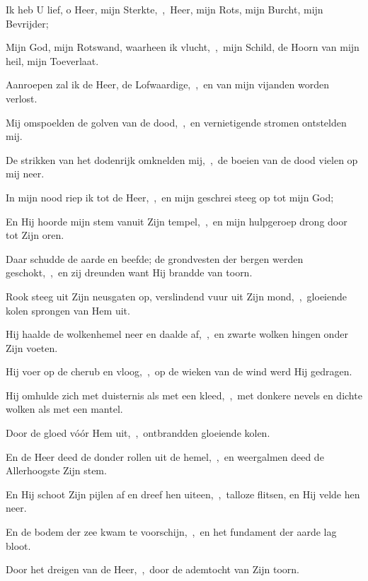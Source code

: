 \documentclass[12pt,twoside,a5paper]{article}
\begin{document}
\begin{halfparskip}
  Ik heb U lief, o Heer, mijn Sterkte,~\sep\ Heer, mijn Rots, mijn Burcht, mijn Bevrijder;


  Mijn God, mijn Rotswand, waarheen ik vlucht,~\sep\ mijn Schild, de Hoorn van mijn heil, mijn Toeverlaat.

  Aanroepen zal ik de Heer, de Lofwaardige,~\sep\ en van mijn vijanden worden verlost.

  Mij omspoelden de golven van de dood,~\sep\ en vernietigende stromen ontstelden mij.

  De strikken van het dodenrijk omknelden mij,~\sep\ de boeien van de dood vielen op mij neer.

  In mijn nood riep ik tot de Heer,~\sep\ en mijn geschrei steeg op tot mijn God;

  En Hij hoorde mijn stem vanuit Zijn tempel,~\sep\ en mijn hulpgeroep drong door tot Zijn oren.
\end{halfparskip}


\begin{halfparskip}
  Daar schudde de aarde en beefde; de grondvesten der bergen werden geschokt,~\sep\ en zij dreunden want Hij brandde van toorn.

  Rook steeg uit Zijn neusgaten op, verslindend vuur uit Zijn mond,~\sep\ gloeiende kolen sprongen van Hem uit.

  Hij haalde de wolkenhemel neer en daalde af,~\sep\ en zwarte wolken hingen onder Zijn voeten.

  Hij voer op de cherub en vloog,~\sep\ op de wieken van de wind werd Hij gedragen.

  Hij omhulde zich met duisternis als met een kleed,~\sep\ met donkere nevels en dichte wolken als met een mantel.

  Door de gloed vóór Hem uit,~\sep\ ontbrandden gloeiende kolen.

  En de Heer deed de donder rollen uit de hemel,~\sep\ en weergalmen deed de Allerhoogste Zijn stem.

  En Hij schoot Zijn pijlen af en dreef hen uiteen,~\sep\ talloze flitsen, en Hij velde hen neer.

  En de bodem der zee kwam te voorschijn,~\sep\ en het fundament der aarde lag bloot.

  Door het dreigen van de Heer,~\sep\ door de ademtocht van Zijn toorn.
\end{halfparskip}
\end{document}
